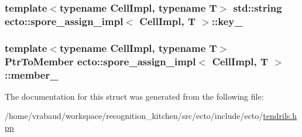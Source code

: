 \subsubsection[{key\+\_\+}]{\setlength{\rightskip}{0pt plus 5cm}template$<$typename Cell\+Impl, typename T$>$ std\+::string {\bf ecto\+::spore\+\_\+assign\+\_\+impl}$<$ Cell\+Impl, T $>$\+::key\+\_\+}\label{structecto_1_1spore__assign__impl_a961946cb7f186c6a836467363b747915}
\hypertarget{structecto_1_1spore__assign__impl_a8d8ead313308f3ecfb7d5f2ed4fbe975}{}
\subsubsection[{member\+\_\+}]{\setlength{\rightskip}{0pt plus 5cm}template$<$typename Cell\+Impl, typename T$>$ {\bf Ptr\+To\+Member} {\bf ecto\+::spore\+\_\+assign\+\_\+impl}$<$ Cell\+Impl, T $>$\+::member\+\_\+}\label{structecto_1_1spore__assign__impl_a8d8ead313308f3ecfb7d5f2ed4fbe975}


The documentation for this struct was generated from the following file\+:\begin{DoxyCompactItemize}
\item 
/home/vrabaud/workspace/recognition\+\_\+kitchen/src/ecto/include/ecto/\hyperlink{tendrils_8hpp}{tendrils.\+hpp}\end{DoxyCompactItemize}
